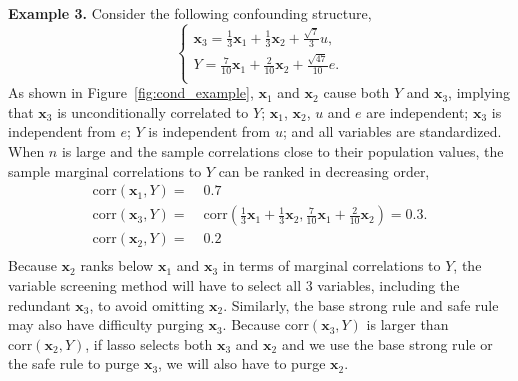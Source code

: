 \documentclass[11pt,authoryear]{elsarticle}
\begin{document}
\smallskip
\noindent
\textbf{Example 3.} Consider the following confounding structure,
%
\begin{equation}
	\begin{cases}
    \mathbf{x}_3 = \frac{1}{3} \mathbf{x}_1 + \frac{1}{3} \mathbf{x}_2 + \frac{\sqrt{7}}{3} u, \\
    Y = \frac{7}{10} \mathbf{x}_1 +  \frac{2}{10} \mathbf{x}_2 +  \frac{\sqrt{47}}{10} e. \\
	\end{cases}
	\label{eqn:example_4}
\end{equation}
%
As shown in Figure~\ref{fig:cond_example}, $\mathbf{x}_1$ and $\mathbf{x}_2$ cause both $Y$ and $\mathbf{x}_3$, implying that $\mathbf{x}_3$ is unconditionally correlated to $Y$; $\mathbf{x}_1$, $\mathbf{x}_2$, $u$ and $e$ are independent; $\mathbf{x}_3$ is independent from $e$; $Y$ is independent from $u$; and all variables are standardized. When $n$ is large and the sample correlations close to their population values, the sample marginal correlations to $Y$ can be ranked in decreasing order,
%
\begin{equation}
  \begin{aligned}
    \mathrm{corr} \left( \mathbf{x}_1, Y \right)  = & \;0.7 \\
    \mathrm{corr} \left( \mathbf{x}_3, Y \right)  = & \;\mathrm{corr} \left( \frac{1}{3} \mathbf{x}_1 + \frac{1}{3} \mathbf{x}_2, \frac{7}{10} \mathbf{x}_1 +  \frac{2}{10} \mathbf{x}_2 \right)
    = 0.3. \\
    \mathrm{corr} \left( \mathbf{x}_2, Y \right)  = & \;0.2 \\
  \end{aligned}
\end{equation}
%
Because $\mathbf{x}_2$ ranks below $\mathbf{x}_1$ and $\mathbf{x}_3$ in terms of marginal correlations to $Y$, the variable screening method will have to select all $3$ variables, including the redundant $\mathbf{x}_3$, to avoid omitting $\mathbf{x}_2$. Similarly, the base strong rule and safe rule may also have difficulty purging $\mathbf{x}_3$. Because $\mathrm{corr} \left( \mathbf{x}_3, Y \right)$ is larger than $\mathrm{corr} \left( \mathbf{x}_2, Y \right)$, if lasso selects both $\mathbf{x}_3$ and $\mathbf{x}_2$ and we use the base strong rule or the safe rule to purge $\mathbf{x}_3$, we will also have to purge $\mathbf{x}_2$.
\end{document}
